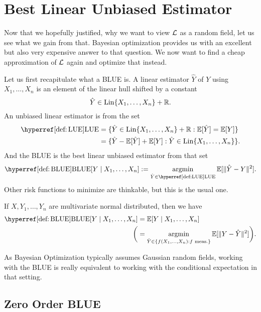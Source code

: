 \section{Best Linear Unbiased Estimator}

Now that we hopefully justified, why we want to view \(\mathcal{L}\) as a random field,
let us see what we gain from that. Bayesian optimization provides us with
an excellent but also very expensive answer to that question. We now want to
find a cheap approximation of \(\mathcal{L}\) again and optimize that instead.

Let us first recapitulate what a BLUE is. A linear estimator \(\hat{Y}\) of
\(Y\) using \(X_1,\dots,X_n\) is an element of the linear hull shifted by a
constant 
\begin{equation*}
	\hat{Y}\in \operatorname{Lin}\{X_1,\dots,X_n\} + \mathbb{R}.
\end{equation*}
An unbiased linear estimator is from the set
\begin{align}\label{def: LUE}
	\LUE
	&= \{ \hat{Y} \in \linHull\{X_1,\dots,X_n\} + \real : \E[\hat{Y}] = \E[Y]\}\\
	\nonumber
	&= \{ \hat{Y} - \E[\hat{Y}] + \E[Y] : \hat{Y} \in \linHull\{X_1,\dots,X_n\}\}.
\end{align}
And the BLUE is the best linear unbiased estimator from that set
\begin{equation}\label{def: BLUE}
	\BLUE[Y\mid X_1,\dots, X_n] := \argmin_{\hat{Y}\in\LUE} \E[\|\hat{Y} - Y\|^2].
\end{equation}
Other risk functions to minimize are thinkable, but this is the usual one.
\begin{lemma}\label{lem: blue is cond. expectation}
	If \(X,Y_1,\dots, Y_n\) are multivariate normal distributed, then we
	have
	\begin{align*}
		\BLUE[Y\mid X_1,\dots,X_n]
		&= \E[Y\mid X_1,\dots, X_n]\\
		\bigg(&=
		\argmin_{\hat{Y}\in\{f(X_1,\dots, X_n) : f\text{ meas.}\}} \E[\|Y-\hat{Y}\|^2]
		\bigg).
	\end{align*}
\end{lemma}
\begin{remark}
	As Bayesian Optimization typically assumes Gaussian random fields, working with
	the BLUE is really equivalent to working with the conditional expectation in
	that setting.
\end{remark}

\subsection{Zero Order BLUE}

